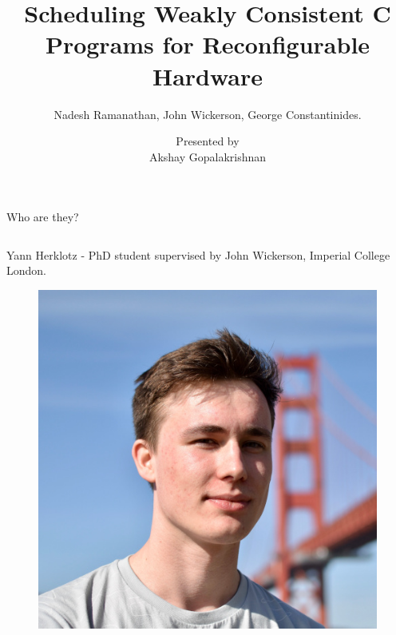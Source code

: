 \documentclass[notes xcolor=dvipsnames]{beamer}
\title{Scheduling Weakly Consistent C Programs for Reconfigurable Hardware}
\subtitle{Nadesh Ramanathan, John Wickerson, George Constantinides.}
\author{Presented by \\ Akshay Gopalakrishnan}
\begin{document}
    
    \begin{frame}

        \maketitle

    \end{frame}

    \begin{frame}{Who are they?}

           \begin{columns}
                
            \begin{column}[]{0.3\textwidth}

                Yann Herklotz - PhD student supervised by John Wickerson, Imperial College London. 
                \begin{figure}
                    \includegraphics[scale=0.2]{YannHerklotz.jpg}
                \end{figure}
                
            \end{column}



\end{columns}
\end{frame}
\end{document}
